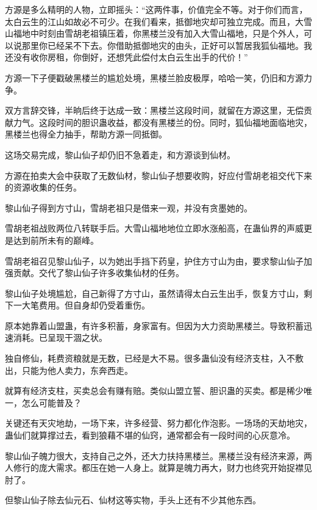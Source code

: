 
\begin{this_body}

方源是多么精明的人物，立即摇头：“这两件事，价值完全不等。对于你们而言，太白云生的江山如故必不可少。在我们看来，抵御地灾却可独立完成。而且，大雪山福地中时刻由雪胡老祖镇压着，你黑楼兰没有加入大雪山福地，只是个外人，可以说那里你已经呆不下去。你借助抵御地灾的由头，正好可以暂居我狐仙福地。我还没有收你房租，你倒好，还想凭此偿付太白云生出手的代价！”

方源一下子便戳破黑楼兰的尴尬处境，黑楼兰脸皮极厚，哈哈一笑，仍旧和方源力争。

双方言辞交锋，半晌后终于达成一致：黑楼兰这段时间，就留在方源这里，无偿贡献力气。这段时间的胆识蛊收益，都没有黑楼兰的份。同时，狐仙福地面临地灾，黑楼兰也得全力抽手，帮助方源一同抵御。

这场交易完成，黎山仙子却仍旧不急着走，和方源谈到仙材。

方源在拍卖大会中获取了无数仙材，黎山仙子想要收购，好应付雪胡老祖交代下来的资源收集的任务。

黎山仙子得到方寸山，雪胡老祖只是借来一观，并没有贪墨她的。

雪胡老祖战败两位八转联手后。大雪山福地地位立即水涨船高，在蛊仙界的声威更是达到前所未有的巅峰。

雪胡老祖召见黎山仙子，以为她出手挡下药皇，护住方寸山为由，要求黎山仙子加强贡献。交代了黎山仙子许多收集仙材的任务。

黎山仙子处境尴尬，自己新得了方寸山，虽然请得太白云生出手，恢复方寸山，剩下一大笔费用。但自身却仍受着重伤。

原本她靠着山盟蛊，有许多积蓄，身家富有。但因为大力资助黑楼兰。导致积蓄迅速消耗。已呈现干涸之状。

独自修仙，耗费资粮就是无数，已经是大不易。很多蛊仙没有经济支柱，入不敷出，只能为他人卖力，东奔西走。

就算有经济支柱，买卖总会有赚有赔。类似山盟立誓、胆识蛊的买卖。都是稀少唯一，怎么可能普及？

关键还有天灾地劫，一场下来，许多经营、努力都化作泡影。一场场的天劫地灾，蛊仙们就算撑过去，看到狼藉不堪的仙窍，通常都会有一段时间的心灰意冷。

黎山仙子魄力很大，支持自己之外，还大力扶持黑楼兰。黑楼兰没有经济来源，两人修行的庞大需求。都压在她一人身上。就算是魄力再大，财力也终究开始捉襟见肘了。

但黎山仙子除去仙元石、仙材这等实物，手头上还有不少其他东西。


\end{this_body}
